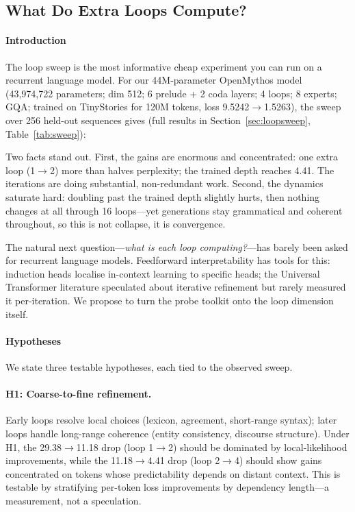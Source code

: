\subsection{What Do Extra Loops Compute?}
\label{ch-mech}

\paragraph{Introduction}

The loop sweep is the most informative cheap experiment you can run on
a recurrent language model. For our 44M-parameter OpenMythos model
(43,974,722 parameters; dim 512; 6 prelude + 2 coda layers; 4 loops;
8 experts; GQA; trained on TinyStories for 120M tokens, loss
9.5242$\rightarrow$1.5263), the sweep over 256 held-out sequences
gives (full results in Section~\ref{sec:loopsweep}, Table~\ref{tab:sweep}):

Two facts stand out. First, the gains are enormous and concentrated:
one extra loop (1$\rightarrow$2) more than halves perplexity; the
trained depth reaches 4.41. The iterations are doing substantial,
non-redundant work. Second, the dynamics saturate hard: doubling past
the trained depth slightly hurts, then nothing changes at all through
16 loops---yet generations stay grammatical and coherent throughout,
so this is not collapse, it is convergence.

The natural next question---\emph{what is each loop computing?}---has
barely been asked for recurrent language models. Feedforward
interpretability has tools for this: induction heads
\citep{elhage2021mathematical} localise in-context learning to
specific heads; the Universal Transformer literature
\citep{dehghani2019universal} speculated about iterative refinement
but rarely measured it per-iteration. We propose to turn the probe
toolkit onto the loop dimension itself.

\paragraph{Hypotheses}

We state three testable hypotheses, each tied to the observed sweep.

\paragraph{H1: Coarse-to-fine refinement.} Early loops resolve local
choices (lexicon, agreement, short-range syntax); later loops handle
long-range coherence (entity consistency, discourse structure). Under
H1, the 29.38$\rightarrow$11.18 drop (loop 1$\rightarrow$2) should be
dominated by local-likelihood improvements, while the
11.18$\rightarrow$4.41 drop (loop 2$\rightarrow$4) should show gains
concentrated on tokens whose predictability depends on distant
context. This is testable by stratifying per-token loss improvements
by dependency length---a measurement, not a speculation.

